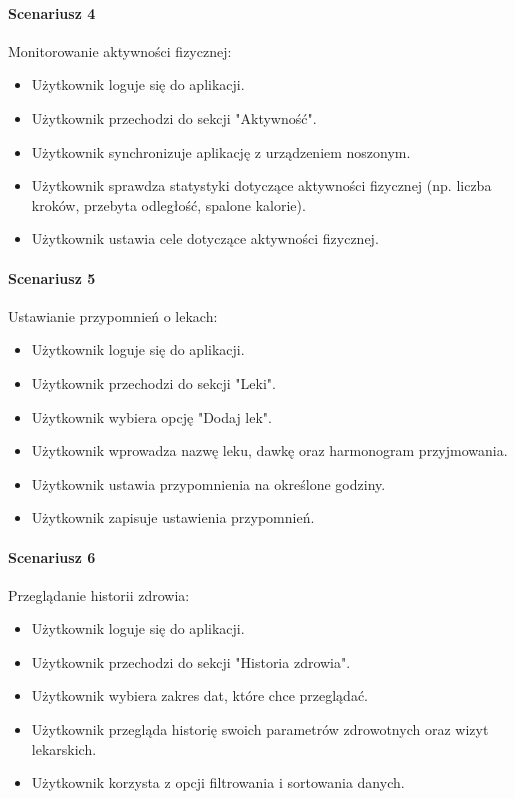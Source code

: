 \paragraph{Scenariusz 4} Monitorowanie aktywności ﬁzycznej:
\begin{itemize}
  \item Użytkownik loguje się do aplikacji.
  \item Użytkownik przechodzi do sekcji "Aktywność".
  \item Użytkownik synchronizuje aplikację z urządzeniem noszonym.
  \item Użytkownik sprawdza statystyki dotyczące aktywności ﬁzycznej (np. liczba kroków, przebyta odległość, spalone kalorie).
  \item Użytkownik ustawia cele dotyczące aktywności ﬁzycznej.
\end{itemize}

\paragraph{Scenariusz 5} Ustawianie przypomnień o lekach:
\begin{itemize}
  \item Użytkownik loguje się do aplikacji.
  \item Użytkownik przechodzi do sekcji "Leki".
  \item Użytkownik wybiera opcję "Dodaj lek".
  \item Użytkownik wprowadza nazwę leku, dawkę oraz harmonogram przyjmowania.
  \item Użytkownik ustawia przypomnienia na określone godziny.
  \item Użytkownik zapisuje ustawienia przypomnień.
\end{itemize}

\paragraph{Scenariusz 6} Przeglądanie historii zdrowia:
\begin{itemize}
  \item Użytkownik loguje się do aplikacji.
  \item Użytkownik przechodzi do sekcji "Historia zdrowia".
  \item Użytkownik wybiera zakres dat, które chce przeglądać.
  \item Użytkownik przegląda historię swoich parametrów zdrowotnych oraz wizyt lekarskich.
  \item Użytkownik korzysta z opcji ﬁltrowania i sortowania danych.
\end{itemize}

